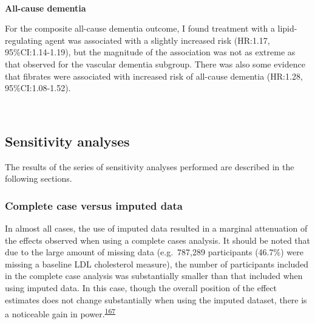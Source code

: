 \documentclass[a4paper, twoside]{templates/ociamthesis}
\begin{document}
~

\textbf{All-cause dementia}

For the composite all-cause dementia outcome, I found treatment with a lipid-regulating agent was associated with a slightly increased risk (HR:1.17, 95\%CI:1.14-1.19), but the magnitude of the association was not as extreme as that observed for the vascular dementia subgroup. There was also some evidence that fibrates were associated with increased risk of all-cause dementia (HR:1.28, 95\%CI:1.08-1.52).

~

\hypertarget{sensitivity-analyses-2}{%
\subsection{Sensitivity analyses}\label{sensitivity-analyses-2}}

The results of the series of sensitivity analyses performed are described in the following sections.

\hypertarget{complete-case-versus-imputed-data}{%
\subsubsection{Complete case versus imputed data}\label{complete-case-versus-imputed-data}}

In almost all cases, the use of imputed data resulted in a marginal attenuation of the effects observed when using a complete cases analysis. It should be noted that due to the large amount of missing data (e.g.~787,289 participants (46.7\%) were missing a baseline LDL cholesterol measure), the number of participants included in the complete case analysis was substantially smaller than that included when using imputed data. In this case, though the overall position of the effect estimates does not change substantially when using the imputed dataset, there is a noticeable gain in power.\textsuperscript{\protect\hyperlink{ref-sterne2009}{167}}

~
\end{document}
